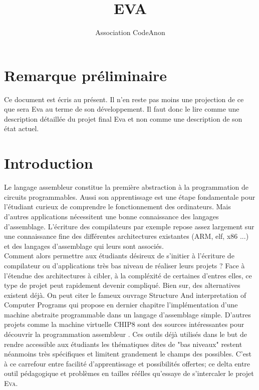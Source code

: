 \documentclass[11pt,twoside,french]{article}
\newcommand{\noun}[1]{\textsc{#1}}
\begin{document}
\title{EVA}
\author{Association CodeAnon}

\maketitle
\clearpage{}
\tableofcontents{}
\cleardoublepage{}
\vfill{}

\section{Remarque préliminaire}

Ce document est écris au présent. Il n'en reste pas moins une projection de ce que sera Eva au terme de son développement. Il faut donc le lire comme une description détaillée du projet final Eva et non comme une description de son état actuel.

\cleardoublepage{}

\section{Introduction}

Le langage assembleur constitue la première abstraction à la programmation
de circuits programmables. Aussi son apprentissage est une étape fondamentale pour l'étudiant curieux de comprendre le fonctionnement des ordinateurs. Mais d'autres applications nécessitent une bonne connaissance des langages d'assemblage. L'écriture des compilateurs par exemple repose assez largement sur une connaissance fine des différentes architectures existantes (ARM, elf, x86 ...) et des langages d'assemblage qui leurs sont associés. \\

Comment alors permettre aux étudiants désireux de s'initier à l'écriture de compilateur ou d'applications très bas niveau de réaliser leurs projets ? Face à l'étendue des architectures à cibler, à la compléxité de certaines d'entres elles, ce type de projet peut rapidement devenir compliqué. Bien sur, des alternatives existent déjà. On peut citer le fameux ouvrage Structure And interpretation of Computer Programs \cite{SICP} qui propose en dernier chapitre l'implémentation d'une machine abstraite programmable dans un langage d'assemblage simple. D'autres projets comme la machine virtuelle CHIP8 sont des sources intéressantes pour découvrir la programmation assembleur \cite{CHIP8}. Ces outils déjà utilisés dans le but de rendre accessible aux étudiants les thématiques dites de "bas niveaux" restent néanmoins très spécifiques et limitent grandement le champs des possibles. C'est à ce carrefour entre facilité d'apprentissage et possibilités offertes; ce delta entre outil pédagogique et problèmes en tailles réélles qu'essaye de s'intercaler le projet \noun{Eva}. \\
\end{document}
